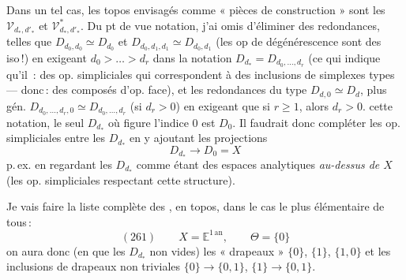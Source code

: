 \documentclass[11pt,a4paper]{article}
\begin{document}
Dans un tel cas, les topos envisagés comme « pièces de construction » sont les $\mathcal{V}_{d_*,d'_*}$ et $\mathcal{V}^*_{d_*,d'_*}$. Du pt de vue notation, j'ai omis d'éliminer des redondances, telles que $D_{d_0,d_0}\simeq D_{d_0}$ et $D_{d_0,d_1,d_1}\simeq D_{d_0,d_1}$ (les op  de dégénérescence sont des iso\,!) en exigeant $d_0>\dots>d_r$ dans la notation $D_{d_*}=D_{d_0,\dots,d_r}$ (ce qui indique qu'il \ill{} \ill{}\,: des op. simpliciales qui correspondent à des inclusions de simplexes types --- donc\,: des composés d'op. face),  et les redondances du type $D_{d,0}\simeq D_d$, plus gén. $D_{d_0,\dots,d_r,0}\simeq D_{d_0,\dots,d_r}$ (si $d_r>0$) en exigeant que si $r\geqslant 1$, alors $d_r>0$. \struck{\ill{}}  cette notation, le seul $D_{d_*}$ où figure l'indice $0$ est $D_0$. Il faudrait donc compléter  les op. simpliciales entre les $D_{d_*}$ en y ajoutant les projections
\[ D_{d_*}\longrightarrow D_0=X \]
p.\,ex. en regardant les $D_{d_*}$ comme étant des espaces analytiques \emph{au-dessus de $X$} (les op. simpliciales respectant cette structure).

Je vais faire la liste complète des  \struck{\ill{}}, en topos, dans le cas le plus élémentaire de tous\,:
\[ (261)\qquad X=\mathbb{E}^{1\,\mathrm{an}},\qquad \Theta=\{0\} \]
on aura donc (en  que les $D_{d_*}$  non vides) les « drapeaux » $\{0\}$, $\{1\}$, $\{1,0\}$ et les inclusions de drapeaux non triviales $\{0\}\to\{0,1\}$, $\{1\}\to\{0,1\}$.
\end{document}
